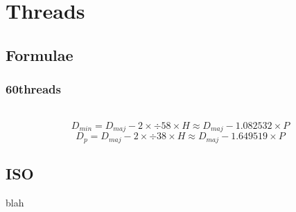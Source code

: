\chapter{Threads}
\section{Formulae}\label{thread_formulae}
\subsection{60\degree threads}
$$ $$\\
$$D_{min}= D_{maj} - 2 \times \div{5}{8} \times H \approx D_{maj} - 1.082532 \times P $$ 
$$D_{p}= D_{maj} - 2 \times \div{3}{8} \times H \approx D_{maj} - 1.649519 \times P $$


\section{ISO}
blah
\\ \\ \\ \\ \\ \\ \\ \\ \\ \\ \\ \\ \\ \\ \\ \\ \\ \\               

